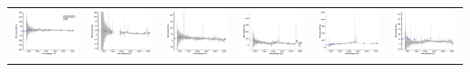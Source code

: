 \begin{center}
\begin{longtable}{l l l l l l }
    \includegraphics[width=0.3\linewidth, clip]{Figs/Figs-lamost/spec-56218-EG213945N020821M01_sp02-208-STRIPE82-0120-007072.pdf} & \includegraphics[width=0.3\linewidth, clip]{Figs/Figs-lamost/spec-56218-EG213945N020821M01_sp05-072-STRIPE82-0122-053411.pdf} & \includegraphics[width=0.3\linewidth, clip]{Figs/Figs-lamost/spec-56285-HD122600N020231M01_sp08-053-SPLUS-n02n28-045059.pdf} & \includegraphics[width=0.3\linewidth, clip]{Figs/Figs-lamost/spec-56285-HD122600N020231M01_sp10-243-SPLUS-n02n26-033149.pdf} & \includegraphics[width=0.3\linewidth, clip]{Figs/Figs-lamost/spec-56591-EG012606S021203F01_sp09-053-STRIPE82-0033-008289.pdf} & \includegraphics[width=0.3\linewidth, clip]{Figs/Figs-lamost/spec-55893-F9304_sp15-076-STRIPE82-0057-019420.pdf} \\

\end{longtable}
\end{center}
